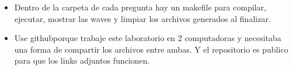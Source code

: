 \begin{itemize}
    \item Dentro de la carpeta de cada pregunta hay un makefile para compilar, ejecutar, mostrar las waves y limpiar los archivos generados al finalizar.
    \item Use github\faGithub \space porque trabaje este laboratorio en 2 computadoras y necesitaba una forma de compartir los archivos entre ambas. Y el repositorio es publico para que los links adjuntos funcionen.
\end{itemize}
